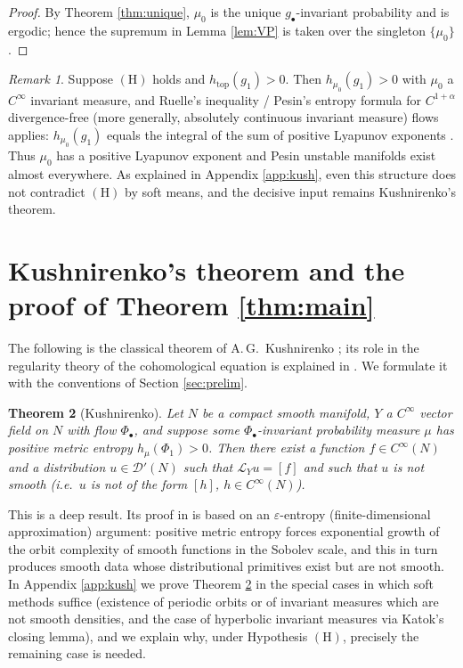 \documentclass[11pt]{amsart}
\theoremstyle{plain}
\newtheorem{theorem}{Theorem}[section]
\theoremstyle{definition}
\theoremstyle{remark}
\newtheorem{remark}[theorem]{Remark}
\newcommand{\Dp}{\mathcal{D}'}
\begin{document}
\begin{proof}
By Theorem \ref{thm:unique}, $\mu_0$ is the unique
$g_\bullet$-invariant probability and is ergodic; hence the supremum in
Lemma \ref{lem:VP} is taken over the singleton $\{\mu_0\}$.
\end{proof}

\begin{remark}\label{rem:pesin}
Suppose $(\mathrm{H})$ holds and $h_{\mathrm{top}}(g_1)>0$. Then
$h_{\mu_0}(g_1)>0$ with $\mu_0$ a $C^\infty$ invariant measure, and
Ruelle's inequality / Pesin's entropy formula for $C^{1+\alpha}$
divergence-free (more generally, absolutely continuous invariant
measure) flows applies: $h_{\mu_0}(g_1)$ equals the integral of the sum
of positive Lyapunov exponents \cite{HPT,BCF}. Thus $\mu_0$ has a
positive Lyapunov exponent and Pesin unstable manifolds exist almost
everywhere. As explained in Appendix \ref{app:kush}, even this structure
does not contradict $(\mathrm{H})$ by soft means, and the decisive input
remains Kushnirenko's theorem.
\end{remark}

\section{Kushnirenko's theorem and the proof of Theorem
\ref{thm:main}}\label{sec:kush}

The following is the classical theorem of A.\,G.~Kushnirenko
\cite{Kus}; its role in the regularity theory of the cohomological
equation is explained in \cite{dlLMM}. We formulate it with the
conventions of Section \ref{sec:prelim}.

\begin{theorem}[Kushnirenko]\label{thm:kush}
Let $N$ be a compact smooth manifold, $Y$ a $C^\infty$ vector field on
$N$ with flow $\Phi_\bullet$, and suppose some
$\Phi_\bullet$-invariant probability measure $\mu$ has positive metric
entropy $h_\mu(\Phi_1)>0$. Then there exist a function $f\in C^\infty(N)$
and a distribution $u\in\Dp(N)$ such that $\mathcal L_Yu=[f]$ and such
that $u$ is not smooth (i.e.\ $u$ is not of the form $[h]$,
$h\in C^\infty(N)$).
\end{theorem}

This is a deep result. Its proof in \cite{Kus} is based on an
$\varepsilon$-entropy (finite-dimensional approximation) argument:
positive metric entropy forces exponential growth of the orbit
complexity of smooth functions in the Sobolev scale, and this in turn
produces smooth data whose distributional primitives exist but are not
smooth. In Appendix \ref{app:kush} we prove Theorem \ref{thm:kush} in
the special cases in which soft methods suffice (existence of periodic
orbits or of invariant measures which are not smooth densities, and the
case of hyperbolic invariant measures via Katok's closing lemma), and we
explain why, under Hypothesis $(\mathrm{H})$, precisely the remaining
case is needed.
\end{document}
